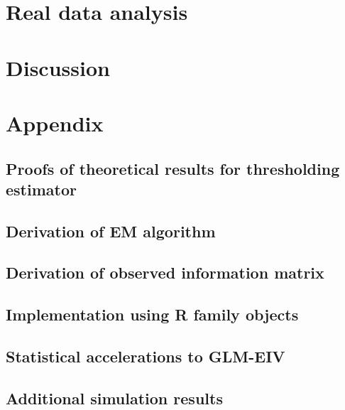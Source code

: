 \documentclass[12pt]{article}
\begin{document}
\section{Real data analysis}

\section{Discussion}

\section{Appendix}


\subsection{Proofs of theoretical results for thresholding estimator}

\subsection{Derivation of EM algorithm}

\subsection{Derivation of observed information matrix}

\subsection{Implementation using R family objects}

\subsection{Statistical accelerations to GLM-EIV}

\subsection{Additional simulation results}



\end{document}
